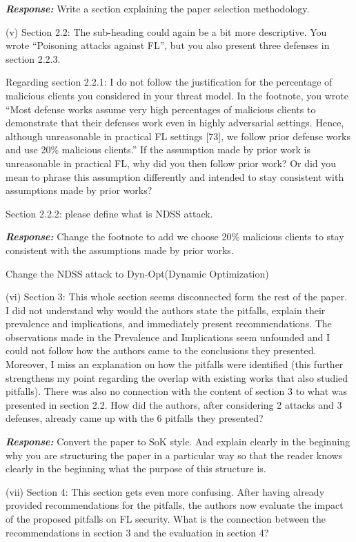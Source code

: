 \textbf{\textit{Response:}}
Write a section explaining the paper selection methodology.

(v) Section 2.2: The sub-heading could again be a bit more descriptive. You wrote “Poisoning attacks against FL”, but you also present three defenses in section 2.2.3. 

Regarding section 2.2.1: I do not follow the justification for the percentage of malicious clients you considered in your threat model. In the footnote, you wrote “Most defense works assume very high percentages of malicious clients to demonstrate that their defenses work even in highly adversarial settings. Hence, although unreasonable in practical FL settings [73], we follow prior defense works and use 20\% malicious clients.” If the assumption made by prior work is unreasonable in practical FL, why did you then follow prior work? Or did you mean to phrase this assumption differently and intended to stay consistent with assumptions made by prior works?

Section 2.2.2: please define what is NDSS attack.

\textbf{\textit{Response:}}
Change the footnote to add we choose 20\% malicious clients to stay consistent with the assumptions made by prior works.

Change the NDSS attack to Dyn-Opt(Dynamic Optimization)


(vi) Section 3: This whole section seems disconnected form the rest of the paper. I did not understand why would the authors state the pitfalls, explain their prevalence and implications, and immediately present recommendations. The observations made in the Prevalence and Implications seem unfounded and I could not follow how the authors came to the conclusions they presented. Moreover, I miss an explanation on how the pitfalls were identified (this further strengthens my point regarding the overlap with existing works that also studied pitfalls). There was also no connection with the content of section 3 to what was presented in section 2.2. How did the authors, after considering 2 attacks and 3 defenses, already came up with the 6 pitfalls they presented?

\textbf{\textit{Response:}}
Convert the paper to SoK style. And explain clearly in the beginning why you are structuring the paper in a particular way so that the reader knows clearly in the beginning what the purpose of this structure is.

(vii) Section 4: This section gets even more confusing. After having already provided recommendations for the pitfalls, the authors now evaluate the impact of the proposed pitfalls on FL security. What is the connection between the recommendations in section 3 and the evaluation in section 4?

